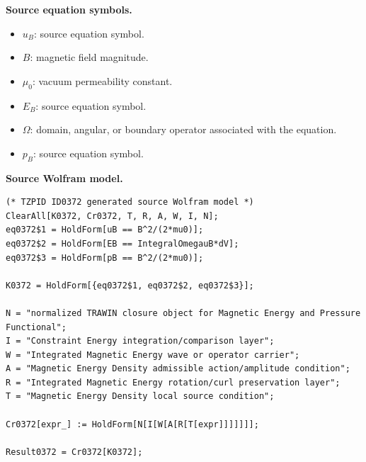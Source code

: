 \begin{minipage}[t]{0.49\linewidth}
\begingroup
\small
\raggedright
\textbf{Source equation symbols.}\par
\begin{itemize}[leftmargin=1.35em,itemsep=1pt,topsep=1pt,parsep=0pt]
    \item $u_{B}$: source equation symbol.
    \item $B$: magnetic field magnitude.
    \item $\mu_{0}$: vacuum permeability constant.
    \item $E_{B}$: source equation symbol.
    \item $\Omega$: domain, angular, or boundary operator associated with the equation.
    \item $p_{B}$: source equation symbol.
\end{itemize}
\endgroup
\end{minipage}\hfill
\begin{minipage}[t]{0.47\linewidth}
\begingroup
\scriptsize
\raggedright
\textbf{Source Wolfram model.}\par
\begin{Verbatim}[fontsize=\tiny,breaklines=true,breakanywhere=true]
(* TZPID ID0372 generated source Wolfram model *)
ClearAll[K0372, Cr0372, T, R, A, W, I, N];
eq0372$1 = HoldForm[uB == B^2/(2*mu0)];
eq0372$2 = HoldForm[EB == IntegralOmegauB*dV];
eq0372$3 = HoldForm[pB == B^2/(2*mu0)];

K0372 = HoldForm[{eq0372$1, eq0372$2, eq0372$3}];

N = "normalized TRAWIN closure object for Magnetic Energy and Pressure Functional";
I = "Constraint Energy integration/comparison layer";
W = "Integrated Magnetic Energy wave or operator carrier";
A = "Magnetic Energy Density admissible action/amplitude condition";
R = "Integrated Magnetic Energy rotation/curl preservation layer";
T = "Magnetic Energy Density local source condition";

Cr0372[expr_] := HoldForm[N[I[W[A[R[T[expr]]]]]]];

Result0372 = Cr0372[K0372];
\end{Verbatim}
\endgroup
\end{minipage}

